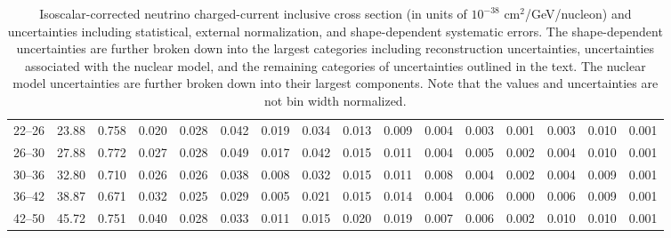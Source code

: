\begin{turnpage}
\begin{table}[hpt]
\begin{tabular}{cccccc|cccc|cccccc}
 22--26 & 	 23.88 & 	 0.758 &  	 0.020 &  	 0.028 &  	 0.042 &  	 0.019 &  	 0.034 &  	 0.013 &  	 0.009 &  	 0.004 &  	 0.003 &  	 0.001 &  	 0.003 &  	 0.010 &  	 0.001 \\ 
 26--30 & 	 27.88 & 	 0.772 &  	 0.027 &  	 0.028 &  	 0.049 &  	 0.017 &  	 0.042 &  	 0.015 &  	 0.011 &  	 0.004 &  	 0.005 &  	 0.002 &  	 0.004 &  	 0.010 &  	 0.001 \\ 
 30--36 & 	 32.80 & 	 0.710 &  	 0.026 &  	 0.026 &  	 0.038 &  	 0.008 &  	 0.032 &  	 0.015 &  	 0.011 &  	 0.008 &  	 0.004 &  	 0.002 &  	 0.004 &  	 0.009 &  	 0.001 \\ 
 36--42 & 	 38.87 & 	 0.671 &  	 0.032 &  	 0.025 &  	 0.029 &  	 0.005 &  	 0.021 &  	 0.015 &  	 0.014 &  	 0.004 &  	 0.006 &  	 0.000 &  	 0.006 &  	 0.009 &  	 0.001 \\ 
 42--50 & 	 45.72 &  	 0.751 &  	 0.040 &  	 0.028 &  	 0.033 &  	 0.011 &  	 0.015 &  	 0.020 &  	 0.019 &  	 0.007 &  	 0.006 &  	 0.002 &  	 0.010 &  	 0.010 &  	 0.001 \\ 
\hline
\end{tabular}
\caption{Isoscalar-corrected neutrino charged-current inclusive cross section (in units of $10^{-38}$ cm$^2$/GeV/nucleon) and uncertainties including statistical, external normalization, and shape-dependent systematic errors. The shape-dependent uncertainties are further broken down into the largest categories including reconstruction uncertainties, uncertainties associated with the nuclear model, and the remaining categories of uncertainties outlined in the text. The nuclear model uncertainties are further broken down into their largest components. Note that the values and uncertainties are not bin width normalized.} 
\label{tbl:FHC-nu-xsec}
\end{table}


\end{turnpage}

